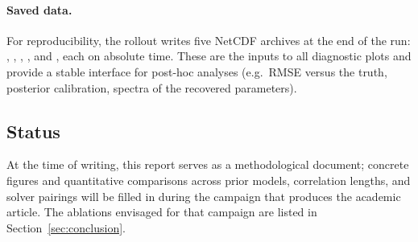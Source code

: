 \paragraph{Saved data.}
For reproducibility, the rollout writes five NetCDF archives at the
end of the run: , ,
, , and
, each on absolute time.  These are the
inputs to all diagnostic plots and provide a stable interface for
post-hoc analyses (e.g.\ RMSE versus the truth, posterior
calibration, spectra of the recovered parameters).

\subsection{Status}
At the time of writing, this report serves as a methodological
document; concrete figures and quantitative comparisons across prior
models, correlation lengths, and solver pairings will be filled in
during the campaign that produces the academic article.  The
ablations envisaged for that campaign are listed in
Section~\ref{sec:conclusion}.
